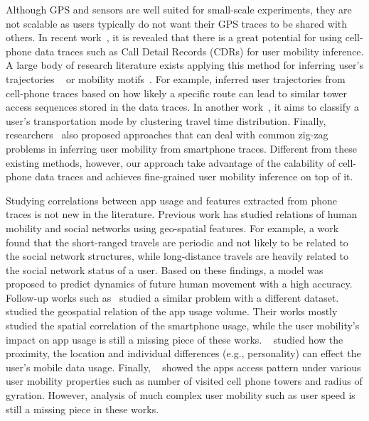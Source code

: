 Although GPS and sensors are well suited for small-scale experiments, they are not scalable as users typically do not want their GPS traces to be shared with others. In recent work~\cite{rose2006mobile},  it is revealed that there is a great potential for using cell-phone data traces such as Call Detail Records (CDRs) for user mobility inference. A large body of research literature exists applying this method for inferring user's trajectories ~\cite{smoreda2013spatiotemporal, hoteit2014estimating, widhalm2015discovering, Alsolami2012Auth, jiang2013review, bekhor2015investigation, leontiadis2014cells} or mobility motifs~\cite{wang2014mobile, gambs2012next}. For example, \cite{Alsolami2012Auth, jiang2013review} inferred user trajectories from cell-phone traces based on how likely a specific route can lead to similar tower access sequences stored in the data traces. In another work~\cite{wang2010transportation}, it aims to classify a user's transportation mode by clustering travel time distribution. Finally, researchers~\cite{bekhor2015investigation} also proposed approaches that can deal with common zig-zag problems in inferring user mobility from smartphone traces.
Different from these existing methods, however, our approach take advantage of the calability of cell-phone data traces and achieves fine-grained user mobility inference on top of it.


Studying correlations between app usage and features extracted from phone traces is not new in the literature. Previous work has studied relations of human mobility and social networks using geo-spatial features. For example, a work \cite{cho2011friendship} found that the short-ranged travels are periodic and not likely to be related to the social network structures, while long-distance travels are heavily related to the social network status of a user. Based on these findings, a model was proposed to predict dynamics of future human movement with a high accuracy. Follow-up works such as~\cite{Noulas11} studied a similar problem with a different dataset. ~\cite{shafiq2012characterizing,yang2015characterizing} studied the geospatial relation of the app usage volume. Their works mostly studied the spatial correlation of the smartphone usage, while the user mobility's impact on app usage is still a missing piece of these works. ~\cite{meng2014analyzing} studied how the proximity, the location and individual differences (e.g., personality) can effect the user's mobile data usage. Finally, ~\cite{yang2016apps} showed the apps access pattern under various user mobility properties such as number of visited cell phone towers and radius of gyration. However, analysis of much complex user mobility such as user speed is still a missing piece in these works. 
